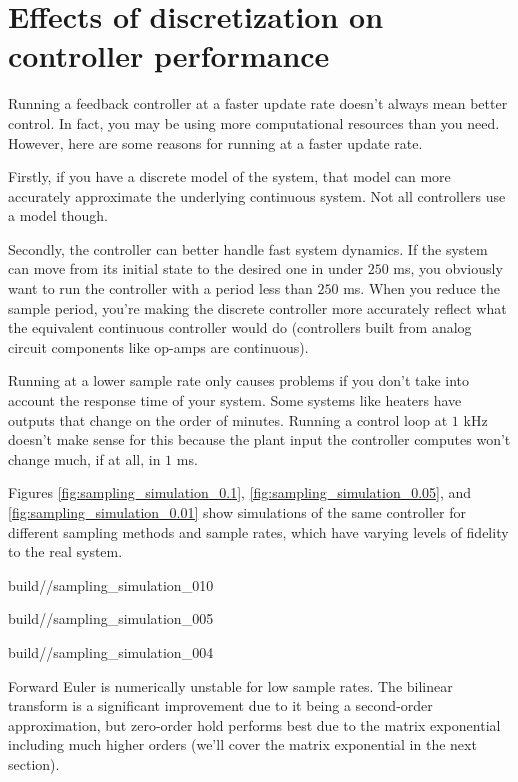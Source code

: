 \section{Effects of discretization on controller performance}

Running a feedback controller at a faster update rate doesn't always mean better
control. In fact, you may be using more computational resources than you need.
However, here are some reasons for running at a faster update rate.

Firstly, if you have a discrete \gls{model} of the \gls{system}, that
\gls{model} can more accurately approximate the underlying continuous
\gls{system}. Not all controllers use a \gls{model} though.

Secondly, the controller can better handle fast \gls{system} dynamics. If the
\gls{system} can move from its initial state to the desired one in under $250$
ms, you obviously want to run the controller with a period less than $250$ ms.
When you reduce the sample period, you're making the discrete controller more
accurately reflect what the equivalent continuous controller would do
(controllers built from analog circuit components like op-amps are continuous).

Running at a lower sample rate only causes problems if you don't take into
account the response time of your \gls{system}. Some \glspl{system} like heaters
have \glspl{output} that change on the order of minutes. Running a control loop
at $1$ kHz doesn't make sense for this because the \gls{plant} \gls{input} the
controller computes won't change much, if at all, in $1$ ms.

Figures \ref{fig:sampling_simulation_0.1}, \ref{fig:sampling_simulation_0.05},
and \ref{fig:sampling_simulation_0.01} show simulations of the same controller
for different sampling methods and sample rates, which have varying levels of
fidelity to the real \gls{system}.
\begin{bookfigure}
  \begin{minisvg}{2}{build/\chapterpath/sampling_simulation_010}
    \caption{Sampling methods for system simulation with $T = 0.1$ s}
    \label{fig:sampling_simulation_0.1}
  \end{minisvg}
  \hfill
  \begin{minisvg}{2}{build/\chapterpath/sampling_simulation_005}
    \caption{Sampling methods for system simulation with $T = 0.05$ s}
    \label{fig:sampling_simulation_0.05}
  \end{minisvg}
  \hfill
  \begin{minisvg}{2}{build/\chapterpath/sampling_simulation_004}
    \caption{Sampling methods for system simulation with $T = 0.01$ s}
    \label{fig:sampling_simulation_0.01}
  \end{minisvg}
\end{bookfigure}

Forward Euler is numerically unstable for low sample rates. The bilinear
transform is a significant improvement due to it being a second-order
approximation, but zero-order hold performs best due to the matrix exponential
including much higher orders (we'll cover the matrix exponential in the next
section).

